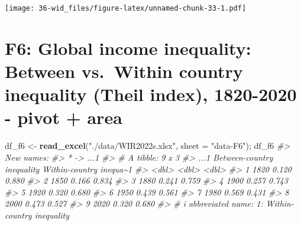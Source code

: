 \documentclass[
  xelatex, ja=standard]{bxjsbook}
\newenvironment{Shaded}{\begin{snugshade}}{\end{snugshade}}
\newcommand{\AttributeTok}[1]{\textcolor[rgb]{0.13,0.29,0.53}{#1}}
\newcommand{\CommentTok}[1]{\textcolor[rgb]{0.56,0.35,0.01}{\textit{#1}}}
\newcommand{\FunctionTok}[1]{\textcolor[rgb]{0.13,0.29,0.53}{\textbf{#1}}}
\newcommand{\NormalTok}[1]{#1}
\newcommand{\OtherTok}[1]{\textcolor[rgb]{0.56,0.35,0.01}{#1}}
\newcommand{\StringTok}[1]{\textcolor[rgb]{0.31,0.60,0.02}{#1}}
\theoremstyle{definition}
\theoremstyle{definition}
\theoremstyle{definition}
\theoremstyle{definition}
\theoremstyle{remark}
\begin{document}
\texttt{[image: 36-wid\_files/figure-latex/unnamed-chunk-33-1.pdf]}

\hypertarget{f6-global-income-inequality-between-vs.-within-country-inequality-theil-index-1820-2020---pivot-area}{%
\section{F6: Global income inequality: Between vs.~Within country inequality (Theil index), 1820-2020 - pivot + area}\label{f6-global-income-inequality-between-vs.-within-country-inequality-theil-index-1820-2020---pivot-area}}

\begin{Shaded}
\begin{Highlighting}[]
\NormalTok{df\_f6 }\OtherTok{\textless{}{-}} \FunctionTok{read\_excel}\NormalTok{(}\StringTok{"./data/WIR2022s.xlsx"}\NormalTok{, }\AttributeTok{sheet =} \StringTok{"data{-}F6"}\NormalTok{); df\_f6}
\CommentTok{\#\textgreater{} New names:}
\CommentTok{\#\textgreater{} * \textasciigrave{}\textasciigrave{} {-}\textgreater{} \textasciigrave{}...1\textasciigrave{}}
\CommentTok{\#\textgreater{} \# A tibble: 9 x 3}
\CommentTok{\#\textgreater{}    ...1 \textasciigrave{}Between{-}country inequality\textasciigrave{} Within{-}country inequa\textasciitilde{}1}
\CommentTok{\#\textgreater{}   \textless{}dbl\textgreater{}                        \textless{}dbl\textgreater{}                   \textless{}dbl\textgreater{}}
\CommentTok{\#\textgreater{} 1  1820                        0.120                   0.880}
\CommentTok{\#\textgreater{} 2  1850                        0.166                   0.834}
\CommentTok{\#\textgreater{} 3  1880                        0.241                   0.759}
\CommentTok{\#\textgreater{} 4  1900                        0.257                   0.743}
\CommentTok{\#\textgreater{} 5  1920                        0.320                   0.680}
\CommentTok{\#\textgreater{} 6  1950                        0.439                   0.561}
\CommentTok{\#\textgreater{} 7  1980                        0.569                   0.431}
\CommentTok{\#\textgreater{} 8  2000                        0.473                   0.527}
\CommentTok{\#\textgreater{} 9  2020                        0.320                   0.680}
\CommentTok{\#\textgreater{} \# i abbreviated name: 1: \textasciigrave{}Within{-}country inequality\textasciigrave{}}
\end{Highlighting}
\end{Shaded}
\end{document}
